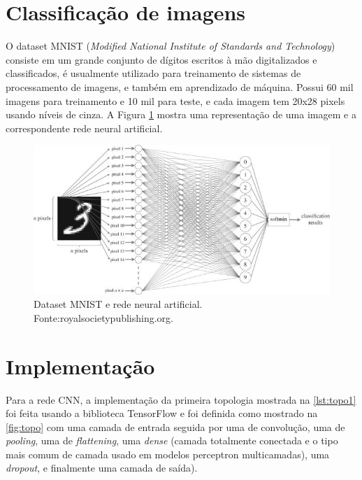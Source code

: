 \documentclass[sigconf, nonacm, screen]{acmart}
\begin{document}
\section{Classificação de imagens}
\label{sec:descricao}

O dataset MNIST (\textit{Modified National Institute of Standards and Technology}) consiste em um grande conjunto de dígitos escritos à mão digitalizados e classificados, é usualmente utilizado para treinamento de sistemas de processamento de imagens, e também em aprendizado de máquina. Possui 60 mil imagens para treinamento e 10 mil para teste, e cada imagem tem 20x28 pixels usando níveis de cinza. A Figura \ref{fig:mnist} mostra uma representação de uma imagem e a correspondente rede neural artificial.

\begin{figure}[ht]
	\centering
	\includegraphics[width=\linewidth]{img/mnist2}
	\caption{Dataset MNIST e rede neural artificial. Fonte:royalsocietypublishing.org.}
	\label{fig:mnist}
\end{figure}




\section{Implementação}
\label{sec:implementacoes}

Para a rede CNN, a implementação da primeira topologia mostrada na \autoref{lst:topo1} foi feita usando a biblioteca TensorFlow e foi definida como mostrado na \autoref{fig:topo} com uma camada de entrada seguida por uma de convolução, uma de \textit{pooling}, uma de \textit{flattening}, uma \textit{dense} (camada totalmente conectada e o tipo mais comum de camada usado em modelos perceptron multicamadas), uma \textit{dropout}, e finalmente uma camada de saída).
\end{document}
